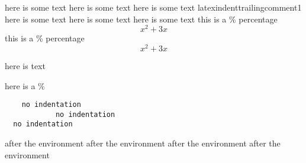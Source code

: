 \begin{myenvironment}
		here is some text       %
		here is some text 
		here is some text %
		latexindenttrailingcomment1
		here is some text 
		here is some text %
		here is some text %
		this is a \% percentage \begin{equation}
			x^2+3x
		\end{equation} this is a \% percentage \begin{equation}
			x^2+3x
		\end{equation} \begin{myenv} here is text \end{myenv}
		here is a \% \begin{verbatim}
    no indentation
            no indentation
  no indentation
		\end{verbatim}
\end{myenvironment}
after the environment%
after the environment       %
after the environment  %
after the environment%

